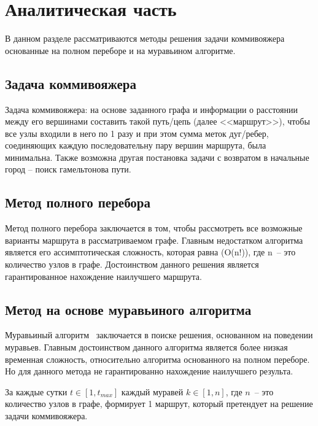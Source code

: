 \chapter{Аналитическая часть}

В данном разделе рассматриваются методы решения задачи коммивояжера основанные на полном переборе и на муравьином алгоритме.


\section{Задача коммивояжера}

Задача коммивояжера: на основе заданного графа и информации о расстоянии между его вершинами составить такой путь/цепь (далее <<маршрут>>), чтобы все узлы входили в него по 1 разу и при этом сумма меток дуг/ребер, соединяющих каждую последовательну пару вершин маршрута, была минимальна. Также возможна другая постановка задачи с возвратом в начальные город -- поиск гамельтонова пути.

\section{Метод полного перебора}

Метод полного перебора заключается в том, чтобы рассмотреть все возможные варианты маршрута в рассматриваемом графе. Главным недостатком алгоритма является его ассимптотическая сложность, которая равна (O(n!)), где n~-- это количество узлов в графе. Достоинством данного решения является гарантированное нахождение наилучшего маршрута.


\section{Метод на основе муравьиного алгоритма}

Муравьиный алгоритм~\cite{algos} заключается в поиске решения, основанном на поведении муравьев. Главным достоинством данного алгоритма является более низкая временная сложность, относительно алгоритма основанного на полном переборе. Но для данного метода не гарантированно нахождение наилучшего результа.

За каждые сутки $t \in [1, t_{max}]$ каждый муравей $k \in [1, n]$, где $n$~-- это количество узлов в графе, формирует 1 маршрут, который претендует на решение задачи коммивояжера.

